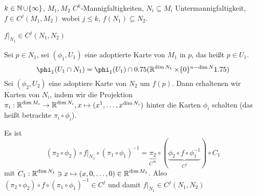 \begin{Loes}
$k \in \operatorname{\mathbb{N}} \cup \{\infty\}$, $M_1, M_2$ $C^k$-Mannigfaltigkeiten, $N_i \subseteq M_i$ Untermannigfaltigkeit, $f \in C^j(M_1, M_2)$ wobei $j \le k$, $f(N_1) \subseteq N_2$.
\begin{description}[font=\normalfont\itshape,leftmargin=*]
\item[Behauptung:]
	$f|_{N_1} \in C^j(N_1, N_2)$
\item[Beweis:]
	Sei $p \in N_1$, sei $(\phi_1, U_1)$ eine adoptierte Karte von $M_1$ in $p$, das hei\ss t $p \in U_1$.
		\[ \phi_1(U_1 \cap N_1) = \phi_1(U_1) \cap \left(\R^{\dim N_1} \times \{0\}^{n-\dim N}\right) \]
	Sei $(\phi_2, U_2)$ eine adoptiere Karte von $N_2$ um $f(p)$. Dann erhaltenen wir Karten von $N_i$, indem wir die Projektion $\pi_i: \operatorname{\mathbb{R}}^{\dim M_i} \to \operatorname{\mathbb{R}}^{\dim N_i}, x \mapsto (x^1,\ldots ,x^{\dim N_i})$ hinter die Karten $\phi_i$ schalten (das hei\ss t betrachte $\pi_i \circ \phi_i$).
	
	Es ist
		\[(\pi_2 \circ \phi_2) \circ f|_{N_1} \circ (\pi_1 \circ \phi_1)^{-1} = \underbrace{\pi_2}_{C^\infty} \circ (\underbrace{\phi_2 \circ f \circ \phi_1^{-1}}_{C^j}) \circ C_1\]
	mit $C_1: \operatorname{\mathbb{R}}^{\dim N_1} \ni x \mapsto (x, 0,\ldots ,0) \in \operatorname{\mathbb{R}}^{\dim M_1}$. Also $(\pi_2 \circ \phi_2) \circ f \circ (\pi_1 \circ \phi_1)^{-1} \in C^j$ und damit $f|_{N_1} \in C^j(N_1, N_2)$
\end{description}
\end{Loes}

